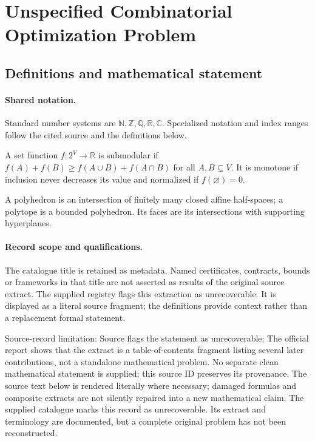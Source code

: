 \documentclass[11pt]{article}
\begin{document}
\section{Unspecified Combinatorial Optimization Problem}\label{statement}

\subsection{Definitions and mathematical statement}

\paragraph{Shared notation.}Standard number systems are $\mathbb N,\mathbb Z,\mathbb Q,\mathbb R,\mathbb C$. Specialized notation and index ranges follow the cited source and the definitions below.


A set function $f:2^V\to\mathbb R$ is submodular if $f(A)+f(B)\geq f(A\cup B)+f(A\cap B)$ for all $A,B\subseteq V$. It is monotone if inclusion never decreases its value and normalized if $f(\varnothing)=0$.

A polyhedron is an intersection of finitely many closed affine half-spaces; a polytope is a bounded polyhedron. Its faces are its intersections with supporting hyperplanes.
\paragraph{Record scope and qualifications.}
The catalogue title is retained as metadata. Named certificates, contracts, bounds or frameworks in that title are not asserted as results of the original source extract.
The supplied registry flags this extraction as unrecoverable. It is displayed as a literal source fragment; the definitions provide context rather than a replacement formal statement.

Source-record limitation: Source flags the statement as unrecoverable: The official report shows that the extract is a table-of-contents fragment listing several later contributions, not a standalone mathematical problem. No separate clean mathematical statement is supplied; this source ID preserves its provenance.
The source text below is rendered literally where necessary; damaged formulas and composite extracts are not silently repaired into a new mathematical claim.
The supplied catalogue marks this record as unrecoverable. Its extract and terminology are documented, but a complete original problem has not been reconstructed.
\end{document}
